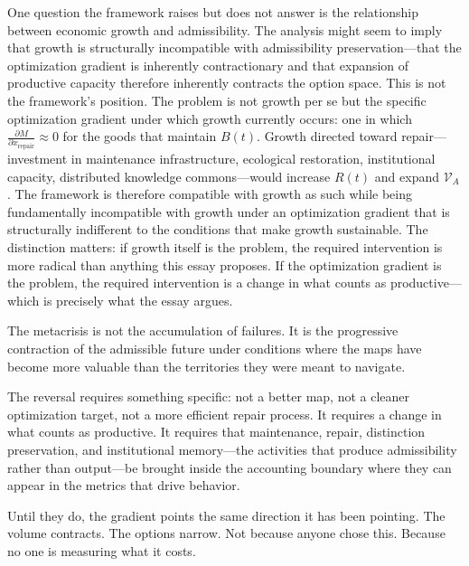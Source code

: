 \documentclass[11pt, letterpaper]{article}
\begin{document}
One question the framework raises but does not answer is the relationship between economic growth and admissibility. The analysis might seem to imply that growth is structurally incompatible with admissibility preservation---that the optimization gradient is inherently contractionary and that expansion of productive capacity therefore inherently contracts the option space. This is not the framework's position. The problem is not growth per se but the specific optimization gradient under which growth currently occurs: one in which $\frac{\partial M}{\partial x_{\text{repair}}} \approx 0$ for the goods that maintain $B(t)$. Growth directed toward repair---investment in maintenance infrastructure, ecological restoration, institutional capacity, distributed knowledge commons---would increase $R(t)$ and expand $\mathcal{V}_A$. The framework is therefore compatible with growth as such while being fundamentally incompatible with growth under an optimization gradient that is structurally indifferent to the conditions that make growth sustainable. The distinction matters: if growth itself is the problem, the required intervention is more radical than anything this essay proposes. If the optimization gradient is the problem, the required intervention is a change in what counts as productive---which is precisely what the essay argues.

The metacrisis is not the accumulation of failures. It is the progressive contraction of the admissible future under conditions where the maps have become more valuable than the territories they were meant to navigate.

The reversal requires something specific: not a better map, not a cleaner optimization target, not a more efficient repair process. It requires a change in what counts as productive. It requires that maintenance, repair, distinction preservation, and institutional memory---the activities that produce admissibility rather than output---be brought inside the accounting boundary where they can appear in the metrics that drive behavior.

Until they do, the gradient points the same direction it has been pointing. The volume contracts. The options narrow. Not because anyone chose this. Because no one is measuring what it costs.
\end{document}

